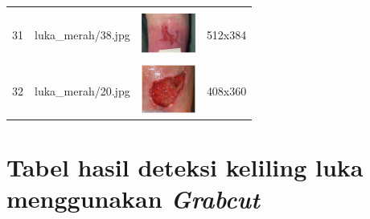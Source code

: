 \begin{table}[H]
\begin{tabular}{|m{0.2in}|m{1.2in}|m{0.7in}|m{0.7in}|}
		& &  &  \\
		31& 
		luka\_merah/38.jpg &
		\includegraphics[width=0.7in]{gambar/dataset_citra/luka_merah/38.jpg}&
		512x384\\
		\hline
		
		& &  &  \\
		32& 
		luka\_merah/20.jpg &
		\includegraphics[width=0.7in]{gambar/dataset_citra/luka_merah/20.jpg}&
		408x360\\
		\hline
	\end{tabular}
\end{table}

\chapter{Tabel hasil deteksi keliling luka menggunakan \emph{Grabcut}}

